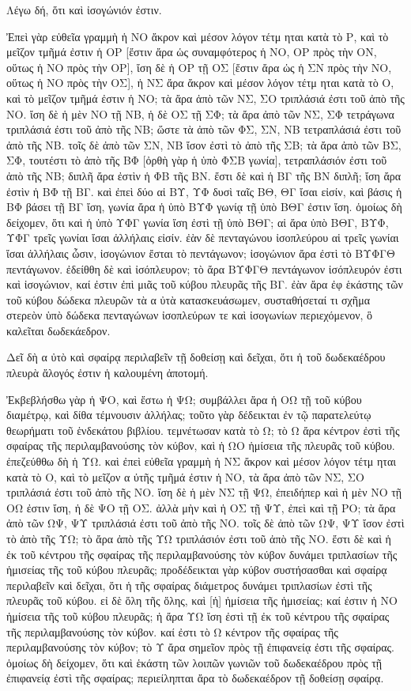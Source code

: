 \begin{Parallel}{}{}
{{\greekfont Λέγω δή, ὅτι καὶ ἰσογώνιόν ἐστιν.}

{\greekfont Ἐπεὶ γὰρ εὐθεῖα γραμμὴ ἡ ΝΟ ἄκρον καὶ μέσον λόγον
τέτμ ηται κατὰ τὸ Ρ, καὶ τὸ μεῖζον τμῆμά
ἐστιν ἡ ΟΡ [ἔστιν ἄρα ὡς συναμφότερος ἡ ΝΟ, ΟΡ πρὸς
τὴν ΟΝ, οὕτως ἡ ΝΟ πρὸς τὴν ΟΡ], ἴση δὲ ἡ ΟΡ
τῇ ΟΣ [ἔστιν ἄρα ὡς ἡ ΣΝ πρὸς τὴν ΝΟ, οὕτως
ἡ ΝΟ πρὸς τὴν ΟΣ], ἡ ΝΣ ἄρα ἄκρον καὶ μέσον λόγον
τέτμ ηται κατὰ τὸ Ο, καὶ τὸ μεῖζον τμῆμά
ἐστιν ἡ ΝΟ; τὰ ἄρα ἀπὸ τῶν ΝΣ, ΣΟ τριπλάσιά ἐστι τοῦ ἀπὸ
τῆς ΝΟ. ἴση δὲ ἡ μὲν ΝΟ τῇ ΝΒ, ἡ δὲ ΟΣ τῇ ΣΦ; τὰ
ἄρα ἀπὸ τῶν ΝΣ, ΣΦ τετράγωνα τριπλάσιά ἐστι τοῦ ἀπὸ τῆς
ΝΒ; ὥστε τὰ ἀπὸ τῶν ΦΣ, ΣΝ, ΝΒ τετραπλάσιά ἐστι  τοῦ ἀπὸ
τῆς ΝΒ. τοῖς δὲ ἀπὸ τῶν ΣΝ, ΝΒ ἴσον ἐστὶ τὸ ἀπὸ
τῆς ΣΒ; τὰ ἄρα ἀπὸ τῶν ΒΣ, ΣΦ, τουτέστι τὸ ἀπὸ τῆς
ΒΦ [ὀρθὴ γὰρ ἡ ὑπὸ ΦΣΒ γωνία], τετραπλάσιόν
ἐστι τοῦ ἀπὸ τῆς ΝΒ; διπλῆ ἄρα ἐστὶν ἡ ΦΒ τῆς ΒΝ.
ἔστι δὲ καὶ ἡ ΒΓ τῆς ΒΝ διπλῆ; ἴση  ἄρα ἐστὶν ἡ ΒΦ τῇ ΒΓ. καὶ
ἐπεὶ δύο αἱ ΒΥ, ΥΦ δυσὶ ταῖς ΒΘ, ΘΓ ἴσαι εἰσίν, καὶ
βάσις ἡ ΒΦ βάσει τῇ ΒΓ ἴση, γωνία ἄρα ἡ ὑπὸ ΒΥΦ
γωνίᾳ τῇ ὑπὸ ΒΘΓ ἐστιν ἴση. ὁμοίως δὴ δείχομεν,
ὅτι καὶ ἡ ὑπὸ ΥΦΓ γωνία ἴση ἐστὶ τῇ ὑπὸ ΒΘΓ;
αἱ ἄρα ὑπὸ ΒΘΓ, ΒΥΦ, ΥΦΓ τρεῖς γωνίαι ἴσαι
ἀλλήλαις εἰσίν. ἐὰν δὲ πενταγώνου ἰσοπλεύρου αἱ 
τρεῖς γωνίαι ἴσαι ἀλλήλαις ὦσιν, ἰσογώνιον ἔσται
τὸ πεντάγωνον; ἰσογώνιον ἄρα ἐστὶ τὸ ΒΥΦΓΘ πεντάγωνον.
ἐδείθθη δὲ καὶ ἰσόπλευρον;
τὸ ἄρα ΒΥΦΓΘ πεντάγωνον ἰσόπλευρόν ἐστι καὶ ἰσογώνιον,
καί ἐστιν ἐπὶ μιᾶς τοῦ κύβου πλευρᾶς τῆς ΒΓ. ἐὰν
ἄρα ἐφ ἑκάστης τῶν τοῦ κύβου δώδεκα
πλευρῶν τὰ α ὐτὰ κατασκευάσωμεν, συσταθήσεταί τι σχῆμα
στερεὸν ὑπὸ δώδεκα πενταγώνων ἰσοπλεύρων
τε καὶ ἰσογωνίων περιεχόμενον, ὃ καλεῖται δωδεκάεδρον.}

{\greekfont Δεῖ δὴ α ὐτὸ καὶ σφαίρᾳ περιλαβεῖν τῇ δοθείσῃ καὶ δεῖχαι,
ὅτι ἡ τοῦ δωδεκαέδρου πλευρὰ ἄλογός ἐστιν ἡ καλουμένη 
ἀποτομή.}

{\greekfont Ἐκβεβλήσθω γὰρ ἡ ΨΟ, καὶ ἔστω ἡ ΨΩ; συμβάλλει ἄρα
ἡ ΟΩ τῇ τοῦ κύβου διαμέτρῳ, καὶ δίθα
τέμνουσιν ἀλλήλας; τοῦτο γὰρ δέδεικται ἐν τῷ
παρατελεύτῳ θεωρήματι  τοῦ ἑνδεκάτου βιβλίου. τεμνέτωσαν
κατὰ τὸ Ω; τὸ Ω ἄρα κέντρον ἐστὶ τῆς σφαίρας τῆς περιλαμβανούσης
τὸν κύβον,
καὶ ἡ ΩΟ ἡμίσεια τῆς πλευρᾶς τοῦ κύβου.
 ἐπεζεύθθω δὴ ἡ ΥΩ. καὶ ἐπεὶ εὐθεῖα γραμμὴ ἡ ΝΣ
ἄκρον καὶ μέσον λόγον τέτμ ηται κατὰ τὸ Ο, καὶ
τὸ μεῖζον α ὐτῆς τμῆμά ἐστιν ἡ ΝΟ, τὰ ἄρα ἀπὸ τῶν ΝΣ, ΣΟ
τριπλάσιά ἐστι τοῦ ἀπὸ τῆς ΝΟ. ἴση δὲ ἡ μὲν ΝΣ τῇ ΨΩ,
ἐπειδήπερ καὶ ἡ μὲν ΝΟ τῇ ΟΩ ἐστιν ἴση, ἡ δὲ ΨΟ τῇ
ΟΣ. ἀλλὰ μὴν
καὶ ἡ ΟΣ τῇ ΨΥ, ἐπεὶ καὶ τῇ ΡΟ; τὰ ἄρα ἀπὸ τῶν
 ΩΨ, ΨΥ τριπλάσιά ἐστι τοῦ ἀπὸ τῆς ΝΟ. τοῖς
δὲ ἀπὸ τῶν ΩΨ, ΨΥ ἴσον ἐστὶ τὸ ἀπὸ τῆς ΥΩ; τὸ
ἄρα ἀπὸ τῆς ΥΩ τριπλάσιόν ἐστι τοῦ ἀπὸ τῆς ΝΟ.
ἔστι δὲ καὶ ἡ ἐκ τοῦ κέντρου τῆς σφαίρας τῆς περιλαμβανούσης
τὸν κύβον δυνάμει τριπλασίων τῆς ἡμισείας
τῆς τοῦ κύβου πλευρᾶς; προδέδεικται γὰρ κύβον συστήσασθαι
καὶ σφαίρᾳ περιλαβεῖν καὶ δεῖχαι, ὅτι ἡ τῆς σφαίρας
διάμετρος δυνάμει τριπλασίων ἐστὶ τῆς πλευρᾶς τοῦ κύβου.
εἰ δὲ ὅλη τῆς ὅλης, καὶ [ἡ] ἡμίσεια τῆς ἡμισείας; καί ἐστιν
ἡ ΝΟ ἡμίσεια τῆς
τοῦ κύβου πλευρᾶς; ἡ ἄρα
ΥΩ ἴση ἐστὶ τῇ ἐκ τοῦ κέντρου τῆς σφαίρας τῆς περιλαμβανούσης
τὸν κύβον. καί ἐστι τὸ Ω κέντρον τῆς σφαίρας τῆς περιλαμβανούσης
τὸν κύβον; τὸ Υ ἄρα σημεῖον πρὸς τῇ ἐπιφανείᾳ ἐστι τῆς
σφαίρας. ὁμοίως δὴ δείχομεν, ὅτι καὶ 
ἑκάστη τῶν λοιπῶν γωνιῶν τοῦ δωδεκαέδρου πρὸς τῇ
ἐπιφανείᾳ ἐστὶ τῆς
σφαίρας; περιείληπται ἄρα τὸ δωδεκαέδρον τῇ δοθείσῃ σφαίρᾳ.}

}
\end{Parallel}
